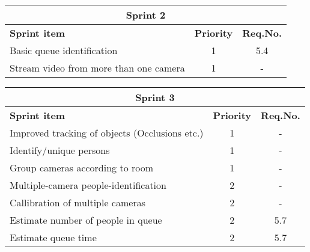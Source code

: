 \label{sprint2}
\begin{center}
	\begin{Large}
	\begin{tabular}{|p{10.5cm}|c|c|}
		\hline
		\multicolumn{3}{|c|}{\textbf{Sprint 2}} \\
		\hline
		\large{\textbf{Sprint item}} & \large{\textbf{Priority}} & \large{\textbf{Req.No.}} \\
		\hline
		\large{Basic queue identification} & \large{1} & 5.4 \\
		\hline
		\large{Stream video from more than one camera} & \large{1} & - \\
		\hline
	\end{tabular}
	\end{Large}
\end{center}



\label{sprint3}
\begin{center}
	\begin{Large}
	\begin{tabular}{|p{10.5cm}|c|c|}
		\hline
		\multicolumn{3}{|c|}{\textbf{Sprint 3}} \\
		\hline
		\large{\textbf{Sprint item}} & \large{\textbf{Priority}} & \large{\textbf{Req.No.}} \\
		\hline
		\large{Improved tracking of objects (Occlusions etc.)} & \large{1} & - \\
		\hline	
		\large{Identify/unique persons} & \large{1} & - \\
		\hline	
		\large{Group cameras according to room} & \large{1} & - \\
		\hline
		\large{Multiple-camera people-identification} & \large{2} & - \\
		\hline
		\large{Callibration of multiple cameras} & \large{2} & - \\
		\hline
		\large{Estimate number of people in queue} & \large{2} & 5.7 \\
		\hline
		\large{Estimate queue time} & \large{2} & 5.7 \\
		\hline
	\end{tabular}
	\end{Large}
\end{center}



